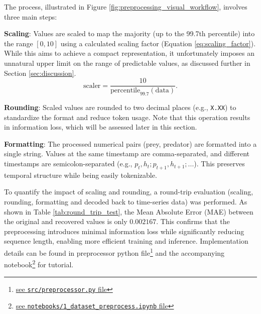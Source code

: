 \documentclass{article}
\begin{document}
The process, illustrated in Figure \ref{fig:preprocessing_visual_workflow}, involves three main steps:
\begin{zenumerate}
    \item \textbf{Scaling}: Values are scaled to map the majority (up to the 99.7th percentile) into the range $[0, 10]$ using a calculated scaling factor (Equation \ref{eq:scaling_factor}). While this aims to achieve a compact representation, it unfortunately imposes an unnatural upper limit on the range of predictable values, as discussed further in Section \ref{sec:discussion}.
    \begin{equation}
        \text{scaler} = \frac{10}{\text{percentile}_{99.7}(\text{data})}.
        \label{eq:scaling_factor}
    \end{equation}
    \item \textbf{Rounding}: Scaled values are rounded to two decimal places (e.g., \texttt{X.XX}) to standardize the format and reduce token usage. Note that this operation results in information loss, which will be assessed later in this section.
    \item \textbf{Formatting}: The processed numerical pairs (prey, predator) are formatted into a single string. Values at the same timestamp are comma-separated, and different timestamps are semicolon-separated (e.g., $p_t, h_t ; p_{t+1}, h_{t+1} ; ...$). This preserves temporal structure while being easily tokenizable.
\end{zenumerate}





To quantify the impact of scaling and rounding, a round-trip evaluation (scaling, rounding, formatting and decoded back to time-series data) was performed. As shown in Table \ref{tab:round_trip_test}, the Mean Absolute Error (MAE) between the original and recovered values is only $0.002167$. This confirms that the preprocessing introduces minimal information loss while significantly reducing sequence length, enabling more efficient training and inference. Implementation details can be found in preprocessor python file\footnote{\href{https://gitlab.developers.cam.ac.uk/phy/data-intensive-science-mphil/assessments/m2_coursework/ym429/-/blob/main/src/preprocessor.py?ref_type=heads}{see \texttt{src/preprocessor.py} file}} and the accompanying notebook\footnote{\href{https://gitlab.developers.cam.ac.uk/phy/data-intensive-science-mphil/assessments/m2_coursework/ym429/-/blob/main/notebooks/1_dataset_preprocess.ipynb?ref_type=heads}{see \texttt{notebooks/1\_dataset\_preprocess.ipynb} file}} for tutorial.
\end{document}
